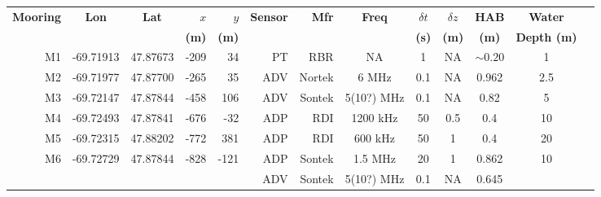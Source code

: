 \documentclass[letterpaper,10pt,landscape]{article}
\begin{document}
\thispagestyle{empty}



\begin{table}
  \centering
  \begin{tabular}{|r|c|c|r|r|r|r|c|c|c|c|c|c|} \hline
    {\bf Mooring}       & {\bf Lon}                  & {\bf Lat}                 & $x$                    & $y$                   & {\bf Sensor} &{\bf Mfr}   & {\bf Freq}&$\delta t$ &$\delta z$& {\bf HAB}  & {\bf Water}         \\
    ~                   &                            &                           & {\bf (m)}              & {\bf (m)}             &              &            &           & {\bf (s)} & {\bf (m)}& {\bf (m)}  & {\bf Depth (m)}     \\\hline \hline
    M1                  & -69.71913                  & 47.87673                  & -209                   & 34                    & PT           & RBR        & NA        & 1         & NA       & $\sim0.20$ & 1                   \\\hline
    M2                  & -69.71977                  & 47.87700                  & -265                   & 35                    & ADV          & Nortek     & 6 MHz     & 0.1       & NA       & 0.962      & 2.5                 \\\hline %
    M3                  & -69.72147                  & 47.87844                  & -458                   & 106                   & ADV          & Sontek     & 5(10?) MHz& 0.1       & NA       & 0.82       & 5                   \\\hline
    M4                  & -69.72493                  & 47.87841                  & -676                   & -32                   & ADP          & RDI        & 1200 kHz  & 50        & 0.5      & 0.4        & 10                  \\\hline
    M5                  & -69.72315                  & 47.88202                  & -772                   & 381                   & ADP          & RDI        & 600 kHz   & 50        & 1        & 0.4        & 20                  \\\hline
    \multirow{4}{*}{M6} & \multirow{4}{*}{-69.72729} & \multirow{4}{*}{47.87844} & \multirow{4}{*}{-828}  & \multirow{4}{*}{-121} & ADP          & Sontek     & 1.5 MHz   & 20        & 1        & 0.862      & \multirow{4}{*}{10} \\ 
    ~                   &                            &                           &                        &                       & ADV          & Sontek     & 5(10?) MHz& 0.1       & NA       & 0.645      &                     \\ 

\end{tabular}
\end{table}
\end{document}
